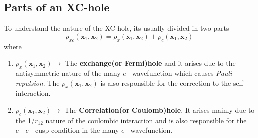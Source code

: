 \documentclass{article}
\begin{document}
 \subsection*{\Large{Parts of an XC-hole}}
  \begin{Large}
   \begin{flushleft}
    To understand the nature of the XC-hole, its usually divided in two parts
    \begin{equation}\label{eq:30}
     \rho_{xc}(\textbf{x}_1,\textbf{x}_2) = \rho_{x}(\textbf{x}_1,\textbf{x}_2) + \rho_{c}(\textbf{x}_1,\textbf{x}_2)
    \end{equation}
    where
    \begin{enumerate}
    \item{$\rho_{x}(\textbf{x}_1,\textbf{x}_2)\rightarrow$ The \textbf{exchange(or Fermi)hole} and it arises due to the antisymmetric nature of the many-$e^-$ wavefunction which causes \textit{Pauli-repulsion}. The $\rho_{x}(\textbf{x}_1,\textbf{x}_2)$ is also responsible for the correction to the self-interaction.}
    \item{$\rho_{c}(\textbf{x}_1,\textbf{x}_2)\rightarrow$ The \textbf{Correlation(or Coulomb)hole}}. It arises mainly due to the 1/$r_{12}$ nature of the coulombic interaction and is also responsible for the $e^-$-$e^-$ cusp-condition in the many-$e^-$ wavefunction.
    \end{enumerate}

\end{flushleft}
\end{Large}
\end{document}
